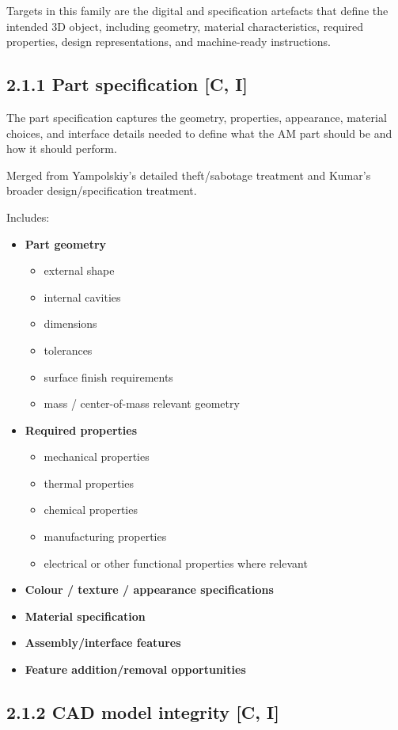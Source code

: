 \documentclass[10pt,a4paper,oneside]{report}
\begin{document}
Targets in this family are the digital and specification artefacts that define the intended 3D object, including geometry, material characteristics, required properties, design representations, and machine-ready instructions.


\subsection{2.1.1 Part specification [C, I]}


The part specification captures the geometry, properties, appearance, material choices, and interface details needed to define what the AM part should be and how it should perform.

Merged from Yampolskiy's detailed theft/sabotage treatment and Kumar's broader design/specification treatment.

Includes:

\begin{itemize}
\item \textbf{Part geometry}
\begin{itemize}
\item external shape
\item internal cavities
\item dimensions
\item tolerances
\item surface finish requirements
\item mass / center-of-mass relevant geometry
\end{itemize}
\item \textbf{Required properties}
\begin{itemize}
\item mechanical properties
\item thermal properties
\item chemical properties
\item manufacturing properties
\item electrical or other functional properties where relevant
\end{itemize}
\item \textbf{Colour / texture / appearance specifications}
\item \textbf{Material specification}
\item \textbf{Assembly/interface features}
\item \textbf{Feature addition/removal opportunities}
\end{itemize}


\subsection{2.1.2 CAD model integrity [C, I]}
\end{document}

